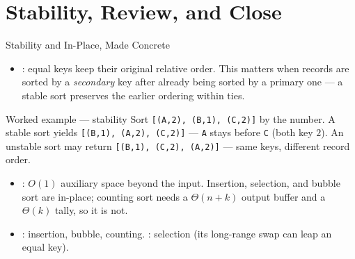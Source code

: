 \documentclass[aspectratio=169]{beamer}
\begin{document}

\section{Stability, Review, and Close}


\begin{frame}{Stability and In-Place, Made Concrete}
  \begin{itemize}
    \item {}: equal keys keep their original relative order. This
      matters when records are sorted by a \emph{secondary} key after already
      being sorted by a primary one --- a stable sort preserves the earlier
      ordering within ties.
  \end{itemize}
  \begin{exampleblock}{Worked example --- stability}
    Sort \texttt{[(A,2), (B,1), (C,2)]} by the number. A stable sort yields
    \texttt{[(B,1), (A,2), (C,2)]} --- \texttt{A} stays before \texttt{C}
    (both key $2$). An unstable sort may return \texttt{[(B,1), (C,2),
    (A,2)]} --- same keys, different record order.
  \end{exampleblock}
  \begin{itemize}
    \item {}: $O(1)$ auxiliary space beyond the input. Insertion,
      selection, and bubble sort are in-place; counting sort needs a
      $\Theta(n+k)$ output buffer and a $\Theta(k)$ tally, so it is not.
    \item {}: insertion, bubble, counting. :
      selection (its long-range swap can leap an equal key).
  \end{itemize}
\end{frame}
\end{document}
